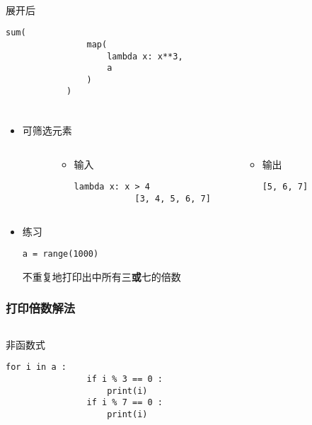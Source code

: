 \begin{CJK}{UTF8}{gbsn}
\begin{frame} [fragile]
\begin{columns}
\begin{column}[T]{.58\textwidth}
			\

			展开后
			\begin{lstlisting}[style=pythonstyle, gobble=12, texcl]
			sum(
				map(
					lambda x: x**3, 
					a
				)
			)
			\end{lstlisting}
		\end{column}
	\end{columns}
\end{frame}

\begin{frame} [fragile]
	\frametitle{}
	\begin{itemize}
	\item {}可筛选元素
	\begin{columns}
		\begin{column}[T]{.1\textwidth}
		\end{column}
		\begin{column}[T]{.4\textwidth}
			\begin{itemize}
			\item 输入
			\begin{lstlisting}[style=pythonstyle, gobble=12, texcl]
			lambda x: x > 4
			[3, 4, 5, 6, 7]
			\end{lstlisting}
			\end{itemize}
		\end{column}
		\begin{column}[T]{.4\textwidth}
			\begin{itemize}
			\item 输出
			\begin{lstlisting}[style=pythonstyle, gobble=12, texcl]
			[5, 6, 7]
			\end{lstlisting}
			\end{itemize}
		\end{column}
		\begin{column}[T]{.1\textwidth}
		\end{column}
	\end{columns}
	\item 练习
		\begin{lstlisting}[style=pythonstyle, gobble=8, texcl]
		a = range(1000)
		\end{lstlisting}
		不重复地打印出中所有三\textbf{或}七的倍数
	\end{itemize}
\end{frame}

\begin{frame} [fragile]
	\frametitle{打印倍数解法}
	\begin{columns}
		\begin{column}[T]{.42\textwidth}
			非函数式
			\begin{lstlisting}[style=pythonstyle, gobble=12, texcl]
			for i in a :
				if i % 3 == 0 :
					print(i)
				if i % 7 == 0 :
					print(i)


\end{lstlisting}
\end{column}
\end{columns}
\end{frame}
\end{CJK}
